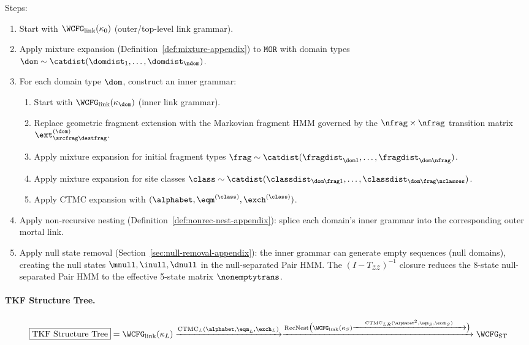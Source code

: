 \noindent Steps:
\begin{enumerate}
\item Start with $\WCFG_{\mathrm{link}}(\kappa_0)$ (outer/top-level link grammar).
\item Apply mixture expansion (Definition~\ref{def:mixture-appendix}) to
  $\texttt{MOR}$ with domain types $\dom \sim \catdist(\domdist_1,\ldots,\domdist_\ndom)$.
\item For each domain type $\dom$, construct an inner grammar:
  \begin{enumerate}
  \item Start with $\WCFG_{\mathrm{link}}(\kappa_\dom)$ (inner link grammar).
  \item Replace geometric fragment extension with the Markovian fragment HMM
    governed by the $\nfrag \times \nfrag$ transition matrix $\ext^{(\dom)}_{\srcfrag\destfrag}$.
  \item Apply mixture expansion for initial fragment types $\frag \sim \catdist(\fragdist_{\dom 1},\ldots,\fragdist_{\dom\nfrag})$.
  \item Apply mixture expansion for site classes $\class \sim \catdist(\classdist_{\dom\frag 1},\ldots,\classdist_{\dom\frag\nclasses})$.
  \item Apply CTMC expansion with $(\alphabet, \eqm^{(\class)}, \exch^{(\class)})$.
  \end{enumerate}
\item Apply non-recursive nesting (Definition~\ref{def:nonrec-nest-appendix}):
  splice each domain's inner grammar into the corresponding
  outer mortal link.
\item Apply null state removal (Section~\ref{sec:null-removal-appendix}):
  the inner grammar can generate empty sequences
  (null domains), creating the null states $\mnull, \inull, \dnull$
  in the null-separated Pair HMM.  The $(I - T_{\mathcal{Z}\mathcal{Z}})^{-1}$
  closure reduces the 8-state null-separated Pair HMM to the effective
  5-state matrix $\nonemptytrans$.
\end{enumerate}

\paragraph{TKF Structure Tree.}

\begin{equation*}
\boxed{\text{TKF Structure Tree}} =
\WCFG_{\mathrm{link}}(\kappa_L)
\xrightarrow{\text{CTMC}_L(\alphabet, \eqm_L, \exch_L)}
\xrightarrow{\text{RecNest}\bigl(
  \WCFG_{\mathrm{link}}(\kappa_S)
  \xrightarrow{\text{CTMC}_{LR}(\alphabet^2, \eqm_S, \exch_S)}
\bigr)}
\WCFG_{\mathrm{ST}}
\end{equation*}

